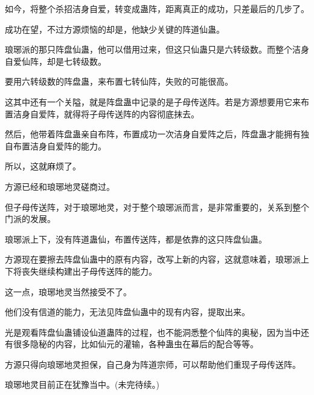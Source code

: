 \begin{this_body}
如今，将整个杀招洁身自爱，转变成蛊阵，距离真正的成功，只差最后的几步了。

成功在望，不过方源烦恼的却是，他缺少关键的阵道仙蛊。

琅琊派的那只阵盘仙蛊，他可以借用过来，但这只仙蛊只是六转级数。而整个洁身自爱仙阵，却是七转级数。

要用六转级数的阵盘蛊，来布置七转仙阵，失败的可能很高。

这其中还有一个关隘，就是阵盘蛊中记录的是子母传送阵。若是方源想要用它来布置洁身自爱阵，就得将子母传送阵的内容彻底抹去。

然后，他带着阵盘蛊亲自布阵，布置成功一次洁身自爱阵之后，阵盘蛊才能拥有独自布置洁身自爱阵的能力。

所以，这就麻烦了。

方源已经和琅琊地灵磋商过。

但子母传送阵，对于琅琊地灵，对于整个琅琊派而言，是非常重要的，关系到整个门派的发展。

琅琊派上下，没有阵道蛊仙，布置传送阵，都是依靠的这只阵盘仙蛊。

方源现在要擦去阵盘仙蛊中的原有内容，改写上新的内容，这就意味着，琅琊派上下将丧失继续构建出子母传送阵的能力。

这一点，琅琊地灵当然接受不了。

他们没有信道的能力，无法见阵盘仙蛊中的现有内容，提取出来。

光是观看阵盘仙蛊铺设仙道蛊阵的过程，也不能洞悉整个仙阵的奥秘，因为当中还有很多隐秘的内容，比如仙元的灌输，各种蛊虫在幕后的配合等等。

方源只得向琅琊地灵担保，自己身为阵道宗师，可以帮助他们重现子母传送阵。

琅琊地灵目前正在犹豫当中。(未完待续。)

\end{this_body}

